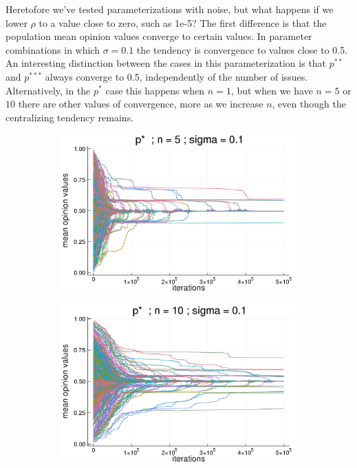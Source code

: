 \documentclass{article}
\begin{document}
    Heretofore we've tested parameterizations with noise, but what happens if we
    lower \(\rho\) to a value close to zero, such as 1e-5? The first difference is
    that the population mean opinion values converge to certain values. In
    parameter combinations in which \(\sigma = 0.1\) the tendency is convergence
    to values close to 0.5. An interesting distinction between the cases in this
    parameterization is that \(p^{**}\) and \(p^{***}\) always converge to 0.5,
    independently of the number of issues. Alternatively, in the \(p^{*}\) case
    this happens when \(n=1\), but when we have \(n=5\) or \(10\) there are
    other values of convergence, more as we increase \(n\), even though the
    centralizing tendency remains.
    \begin{figure}[H]
      \centering
      \begin{subfigure}[b]{0.45\textwidth}
        \includegraphics[width=\textwidth]{img/compare-ps/Poodlcalculatep*n5-rho10e-5-sigma01-00intrans.png}
      \end{subfigure}
      \begin{subfigure}[b]{0.45\textwidth}
        \includegraphics[width=\textwidth]{img/compare-ps/Poodlcalculatep*n10-rho10e-5-sigma01-00intrans.png}

\end{subfigure}
\end{figure}
\end{document}
